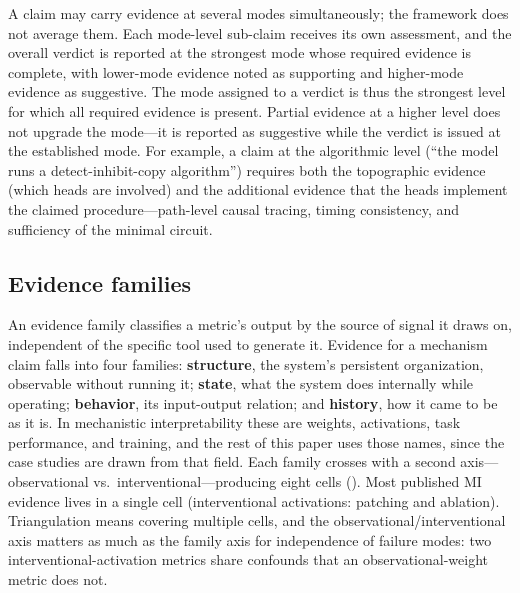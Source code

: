\documentclass{article}
\begin{document}
A claim may carry evidence at several modes simultaneously; the framework does not average them. Each mode-level sub-claim receives its own assessment, and the overall verdict is reported at the strongest mode whose required evidence is complete, with lower-mode evidence noted as supporting and higher-mode evidence as suggestive. The mode assigned to a verdict is thus the strongest level for which all required evidence is present. Partial evidence at a higher level does not upgrade the mode---it is reported as suggestive while the verdict is issued at the established mode. For example, a claim at the algorithmic level (``the model runs a detect-inhibit-copy algorithm'') requires both the topographic evidence (which heads are involved) and the additional evidence that the heads implement the claimed procedure---path-level causal tracing, timing consistency, and sufficiency of the minimal circuit.

\subsection{Evidence families}
\label{sec:evidence-families}

An evidence family classifies a metric's output by the source of signal it draws on, independent of the specific tool used to generate it. Evidence for a mechanism claim falls into four families: \textbf{structure}, the system's persistent organization, observable without running it; \textbf{state}, what the system does internally while operating; \textbf{behavior}, its input-output relation; and \textbf{history}, how it came to be as it is. In mechanistic interpretability these are weights, activations, task performance, and training, and the rest of this paper uses those names, since the case studies are drawn from that field. Each family crosses with a second axis---observational vs.\ interventional---producing eight cells (). Most published MI evidence lives in a single cell (interventional activations: patching and ablation). Triangulation means covering multiple cells, and the observational/interventional axis matters as much as the family axis for independence of failure modes: two interventional-activation metrics share confounds that an observational-weight metric does not.
\end{document}
